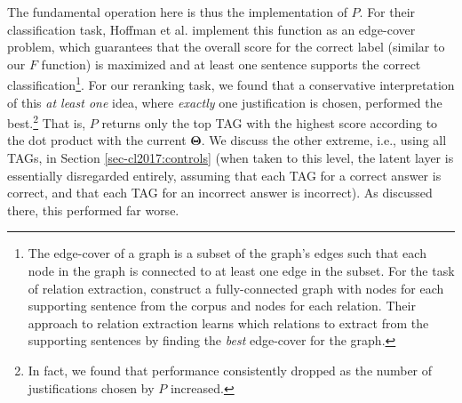 The fundamental operation here is thus the implementation of $P$. For their classification task, Hoffman et al. implement this function as an edge-cover problem, which guarantees that the overall score for the correct label (similar to our $F$ function) is maximized and at least one sentence supports the correct classification\footnote{
The edge-cover of a graph is a subset of the graph's edges such that each node in the graph is connected to at least one edge in the subset.  For the task of relation extraction, \citet{hoffmann2011knowledge} construct a fully-connected graph with nodes for each supporting sentence from the corpus and nodes for each relation.  Their approach to relation extraction learns which relations to extract from the supporting sentences by finding the \textit{best} edge-cover for the graph.}.  
For our reranking task, we found that a conservative interpretation of this {\em at least one} idea, where {\em exactly} one justification is chosen, performed the best.\footnote{In fact, we found that performance consistently dropped as the number of justifications chosen by $P$ increased.} That is, $P$ returns only the top TAG with the highest score according to the dot product with the current $\boldsymbol{\Theta}$. 
We discuss the other extreme, i.e., using all TAGs, in Section \ref{sec-cl2017:controls} (when taken to this level, the latent layer is essentially disregarded entirely, assuming that each TAG for a correct answer is correct, and that each TAG for an incorrect answer is incorrect).  As discussed there, this performed far worse.


